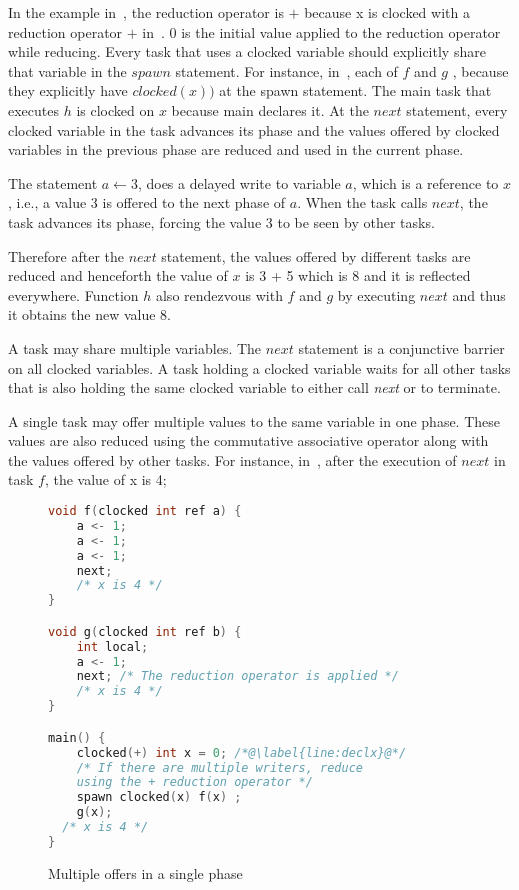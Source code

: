 \documentclass[10pt, conference, compsocconf]{IEEEtran}
\begin{document}
In the example in~, the reduction operator is $+$ because x
is clocked  with a reduction operator $+$ in~.
$0$ is the initial value applied to the reduction operator while reducing.
 Every task that uses a clocked variable should explicitly share that
variable in the $spawn$ statement. 
 For instance, in~, each 
of $f$ and $g$ , because they explicitly have $clocked(x))$ at the
spawn statement. The main task that executes $h$ is clocked on $x$ 
because main declares it.
At the $next$ statement, every clocked variable in the task advances its phase and the values offered
by clocked variables in the previous phase are reduced and used in the current phase. 


The statement $a \leftarrow 3$, does a delayed write to variable $a$, 
which is a reference to $x$, i.e., a value $3$ is offered to the next phase of $a$.
 When the task calls $next$,
the task advances its phase, forcing the value $3$ to be 
seen by other tasks. 

Therefore after the $next$ statement, the values offered by different
tasks are reduced and henceforth the value of $x$ is 3 + 5 which is 8
and it is reflected everywhere.
Function $h$ also rendezvous with $f$ and $g$  by executing $next$
and thus it obtains the new value 8.

 A task may
share multiple variables.
The $next$ statement is a conjunctive barrier on all clocked variables. 
A task holding a clocked variable waits for all other tasks that is also
holding the same clocked variable to either call \emph{next} or to terminate.

A single task may offer multiple values to the same variable in one phase. These values are also reduced using the commutative associative operator along with the values offered by other tasks. For instance, in~, after the execution of 
$next$ in task $f$, the value of x is 4;
\begin{figure}
\begin{lstlisting}[language=C]
void f(clocked int ref a) {
    a <- 1;
    a <- 1;
    a <- 1;
    next;
    /* x is 4 */
}

void g(clocked int ref b) {
    int local;
    a <- 1;
    next; /* The reduction operator is applied */
    /* x is 4 */
}

main() {
    clocked(+) int x = 0; /*@\label{line:declx}@*/
    /* If there are multiple writers, reduce
    using the + reduction operator */
    spawn clocked(x) f(x) ;
    g(x);
  /* x is 4 */
}
\end{lstlisting}
\caption{Multiple offers in a single phase}
\label{fig:ddc-multiple}
\end{figure}
\end{document}
